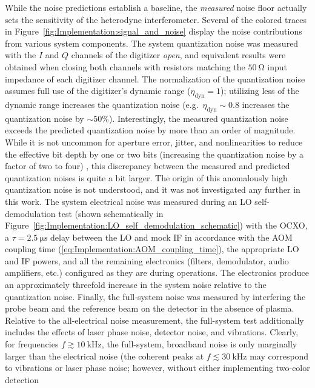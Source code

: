 While the noise predictions establish a baseline,
the \emph{measured} noise floor actually sets the sensitivity
of the heterodyne interferometer.
Several of the colored traces in
Figure~\ref{fig:Implementation:signal_and_noise}
display the noise contributions from various system components.
The system quantization noise was measured
with the $I$ and $Q$ channels of the digitizer \emph{open}, and
equivalent results were obtained when closing both channels with
resistors matching the $\SI{50}{\ohm}$ input impedance
of each digitizer channel.
The normalization of the quantization noise assumes
full use of the digitizer's dynamic range ($\eta_{\text{dyn}} = 1$);
utilizing less of the dynamic range increases the quantization noise
(e.g.\ $\eta_{\text{dyn}} \sim 0.8$
increases the quantization noise by $\sim 50\%$).
Interestingly, the measured quantization noise
exceeds the predicted quantization noise
by more than an order of magnitude.
While it is not uncommon for aperture error, jitter, and nonlinearities
to reduce the effective bit depth by one or two bits
(increasing the quantization noise by a factor of two to four)
\cite[Sec.~10.2.4]{bendat_and_piersol},
this discrepancy between the measured and predicted quantization noises
is quite a bit larger.
The origin of this anomalously high quantization noise is not understood, and
it was not investigated any further in this work.
The system electrical noise was measured
during an LO self-demodulation test
(shown schematically in
Figure~\ref{fig:Implementation:LO_self_demodulation_schematic})
with the OCXO,
a $\tau = \SI{2.5}{\micro\second}$ delay between the LO and mock IF
in accordance with the AOM coupling time
(\ref{eq:Implementation:AOM_coupling_time}),
the appropriate LO and IF powers, and
all the remaining electronics (filters, demodulator, audio amplifiers, etc.)
configured as they are during operations.
The electronics produce an approximately threefold increase
in the system noise relative to the quantization noise.
Finally, the full-system noise was measured
by interfering the probe beam and the reference beam
on the detector in the absence of plasma.
Relative to the all-electrical noise measurement,
the full-system test additionally includes the effects of
laser phase noise, detector noise, and vibrations.
Clearly, for frequencies $f \gtrsim \SI{10}{\kilo\hertz}$,
the full-system, broadband noise is only marginally larger
than the electrical noise
(the coherent peaks at $f \lesssim \SI{30}{\kilo\hertz}$
may correspond to vibrations or laser phase noise;
however, without either implementing two-color detection
